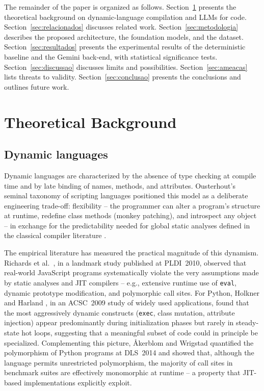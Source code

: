 \documentclass[conference]{IEEEtran}
\begin{document}
The remainder of the paper is organized as follows. Section~\ref{sec:fundamentacao} presents the theoretical background on dynamic-language compilation and LLMs for code. Section~\ref{sec:relacionados} discusses related work. Section~\ref{sec:metodologia} describes the proposed architecture, the foundation models, and the dataset. Section~\ref{sec:resultados} presents the experimental results of the deterministic baseline and the Gemini back-end, with statistical significance tests. Section~\ref{sec:discussao} discusses limits and possibilities. Section~\ref{sec:ameacas} lists threats to validity. Section~\ref{sec:conclusao} presents the conclusions and outlines future work.

\section{Theoretical Background}
\label{sec:fundamentacao}

\subsection{Dynamic languages}
Dynamic languages are characterized by the absence of type checking at compile time and by late binding of names, methods, and attributes. Ousterhout's seminal taxonomy of scripting languages \cite{DBLP:journals/computer/Ousterhout98} positioned this model as a deliberate engineering trade-off: flexibility -- the programmer can alter a program's structure at runtime, redefine class methods (monkey patching), and introspect any object -- in exchange for the predictability needed for global static analyses defined in the classical compiler literature \cite{DBLP:books/aw/AhoLSU06,DBLP:books/mk/CooperT11}.

The empirical literature has measured the practical magnitude of this dynamism. Richards et al.~\cite{DBLP:conf/pldi/RichardsLBV10}, in a landmark study published at PLDI~2010, observed that real-world JavaScript programs systematically violate the very assumptions made by static analyses and JIT compilers -- e.g., extensive runtime use of \texttt{eval}, dynamic prototype modification, and polymorphic call sites. For Python, Holkner and Harland \cite{DBLP:conf/acsc/HolknerH09}, in an ACSC~2009 study of widely used applications, found that the most aggressively dynamic constructs (\texttt{exec}, class mutation, attribute injection) appear predominantly during initialization phases but rarely in steady-state hot loops, suggesting that a meaningful subset of code could in principle be specialized. Complementing this picture, {\AA}kerblom and Wrigstad \cite{DBLP:conf/dls/AkerblomW15} quantified the polymorphism of Python programs at DLS~2014 and showed that, although the language permits unrestricted polymorphism, the majority of call sites in benchmark suites are effectively monomorphic at runtime -- a property that JIT-based implementations explicitly exploit.
\end{document}
